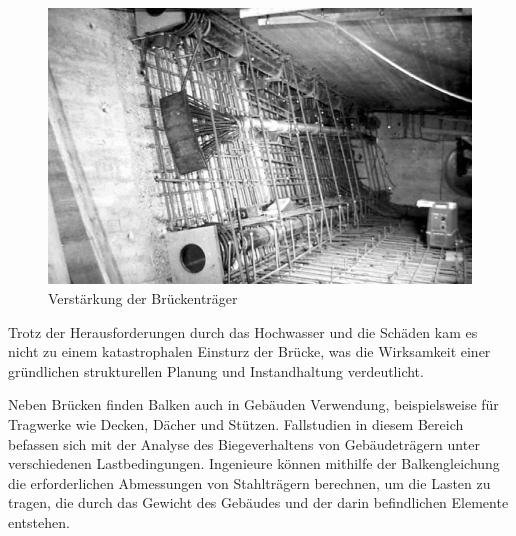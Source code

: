 \begin{figure}
\begin{center}
\includegraphics[width=\textwidth]{papers/balken/images/teil3/ReussbrueckeWassen3.jpg}
\end{center}
\caption{Verstärkung der Brückenträger}
\end{figure}
Trotz der Herausforderungen durch das Hochwasser und die Schäden kam es nicht zu einem katastrophalen Einsturz der Brücke, was die Wirksamkeit einer gründlichen strukturellen Planung und Instandhaltung verdeutlicht.

Neben Brücken finden Balken auch in Gebäuden Verwendung, beispielsweise für Tragwerke wie Decken, Dächer und Stützen.
Fallstudien in diesem Bereich befassen sich mit der Analyse des Biegeverhaltens von Gebäudeträgern unter verschiedenen Lastbedingungen. Ingenieure können mithilfe der Balkengleichung die erforderlichen Abmessungen von Stahlträgern berechnen, um die Lasten zu tragen, die durch das Gewicht des Gebäudes und der darin befindlichen Elemente entstehen.

